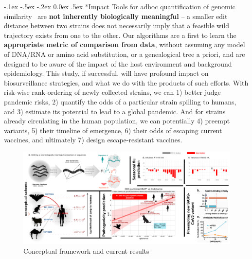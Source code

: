 \documentclass[onecolumn, compsoc,12pt]{IEEEtran}
\makeatletter
\renewcommand\paragraph{\@startsection {section}{1}{\z@}%
                                   {-.1ex \@plus -.5ex \@minus -.2ex}%
                                   {0.0ex \@plus.5ex}%
                                   {\fontsize{11}{10}\selectfont\bfseries\itshape\sffamily\color{black}}}
\renewcommand{\captionN}[1]{\caption{\color{CadetBlue4!80!black} \sffamily \fontsize{9}{10}\selectfont #1  }}
\def\hcov{SARS-CoV-2\xspace}
\def\cov{COVID-19\xspace}
\def\infl{Influenza A\xspace}
\makeatother
\begin{document}
\paragraph*{Impact}  Tools for adhoc quantification of genomic similarity~\cite{posada1998modeltest,goldberger2005genomic,huelsenbeck1997phylogeny,neher2014predicting,VanderMeer2010,Smith2009} are \textbf{not inherently biologically meaningful} -- a smaller edit distance between two strains  does not necessarily imply that a feasible wild trajectory exists from one to the other.  Our  algorithms are a first to learn the \textbf{appropriate metric of comparison from data}, without assuming any model of DNA/RNA or amino acid substitution, or a genealogical tree a priori, and are  designed to be aware of the impact of the  host environment and background epidemiology. %
This study, if successful, will have profound impact on  biosurveillance strategies, and what we do with the products of such efforts. With  risk-wise rank-ordering of  newly collected strains, we can  1) better judge pandemic risks, 2) quantify the odds of a particular strain spilling to humans, and 3) estimate its potential to lead to a global pandemic. And for strains already circulating in the human population, we can potentially  4) preempt variants, 5) their timeline of emergence,  6) their odds of escaping current vaccines, and ultimately 7) design escape-resistant vaccines. %

\begin{figure}[!ht]
  \includegraphics[width=\textwidth]{Figures/fig}
  \captionN{Conceptual framework and current results}\label{fig1}
  \vspace{-10pt}
  
\end{figure}
  \vspace{-10pt}
\end{document}
